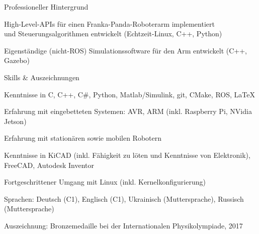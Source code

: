 \documentclass[12pt]{article} %
\begin{document}
\begin{ItemizeSection}{Professioneller Hintergrund}
    \item {}
    \begin{ItemizeSubsection}
        \item High-Level-APIs für einen Franka-Panda-Roboterarm implementiert \\ und Steuerungsalgorithmen entwickelt (Echtzeit-Linux, C++, Python)
        \item Eigenständige (nicht-ROS) Simulationssoftware für den Arm entwickelt (C++, Gazebo)
    \end{ItemizeSubsection}
\end{ItemizeSection}

\begin{ItemizeSection}{Skills \& Auszeichnungen}
    \item Kenntnisse in C, C++, C\#, Python, Matlab/Simulink, git, CMake, ROS, \LaTeX

    \item Erfahrung mit eingebetteten Systemen: AVR, ARM (inkl. Raspberry Pi, NVidia Jetson)

    \item Erfahrung mit stationären sowie mobilen Robotern

    \item Kenntnisse in KiCAD (inkl. Fähigkeit zu löten und Kenntnisse von Elektronik), FreeCAD, Autodesk Inventor

    \item Fortgeschrittener Umgang mit Linux (inkl. Kernelkonfigurierung)

    \item Sprachen: Deutsch (C1), Englisch (C1), Ukrainisch (Muttersprache), Russisch (Muttersprache)

    \item Auszeichnung: Bronzemedaille bei der Internationalen Physikolympiade, 2017
\end{ItemizeSection}


\end{document}
